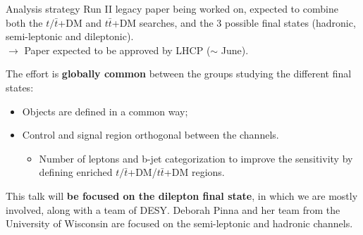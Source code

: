 \documentclass[8pt]{beamer}
\begin{document}
\begin{frame}{Analysis strategy}
\justifying
Run II legacy paper being worked on, expected to \alert{combine both the $t/\bar t$+DM and $t \bar t$+DM searches}, and the 3 possible final states (hadronic, semi-leptonic and dileptonic). \\
\hspace{10pt} $\rightarrow$ Paper expected to be approved by LHCP ($\sim$ June). \vfill

The effort is \textbf{globally common} between the groups studying the different final states:
\begin{itemize}
\justifying
\item Objects are defined in a common way;
\item Control and signal region orthogonal between the channels.
\begin{itemize}
\justifying
\item Number of leptons and b-jet categorization to improve the sensitivity by defining enriched $t/\bar t$+DM/$t \bar t$+DM regions.
\end{itemize}
\end{itemize} \vfill

This talk will \textbf{be focused on the dilepton final state}, in which we are mostly involved, along with a team of DESY. Deborah Pinna and her team from the University of Wisconsin are focused on the semi-leptonic and hadronic channels. \vfill
\end{frame}
\end{document}

